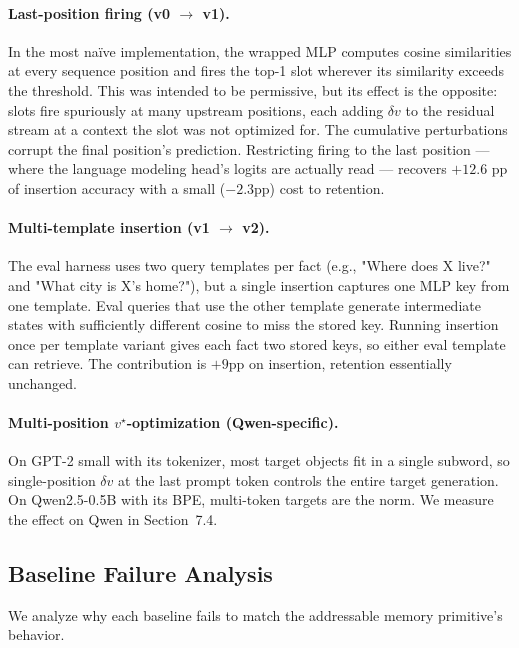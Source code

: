 \documentclass[11pt,a4paper]{article}
\begin{document}
\paragraph{Last-position firing (v0 $\to$ v1).} In the most na\"ive
implementation, the wrapped MLP computes cosine similarities at every
sequence position and fires the top-1 slot wherever its similarity
exceeds the threshold. This was intended to be permissive, but its
effect is the opposite: slots fire spuriously at many upstream positions,
each adding $\delta v$ to the residual stream at a context the slot was
not optimized for. The cumulative perturbations corrupt the final
position's prediction. Restricting firing to the last position --- where
the language modeling head's logits are actually read --- recovers
$+12.6$ pp of insertion accuracy with a small ($-2.3$pp) cost to
retention.

\paragraph{Multi-template insertion (v1 $\to$ v2).} The eval harness uses
two query templates per fact (e.g., "Where does X live?" and "What
city is X's home?"), but a single insertion captures one MLP key from
one template. Eval queries that use the other template generate
intermediate states with sufficiently different cosine to miss the
stored key. Running insertion once per template variant gives each
fact two stored keys, so either eval template can retrieve. The
contribution is $+9$pp on insertion, retention essentially unchanged.

\paragraph{Multi-position $v^\star$-optimization (Qwen-specific).}
On GPT-2 small with its tokenizer, most target objects fit in a single
subword, so single-position $\delta v$ at the last prompt token controls
the entire target generation. On Qwen2.5-0.5B with its BPE, multi-token
targets are the norm. We measure the effect on Qwen in Section~7.4.

\subsection{Baseline Failure Analysis}

We analyze why each baseline fails to match the addressable memory
primitive's behavior.
\end{document}
